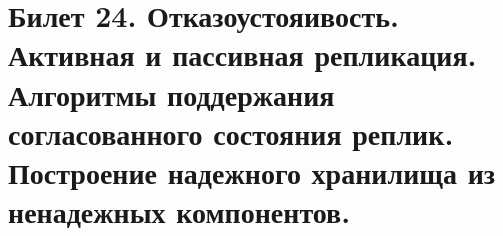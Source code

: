 \newpage
\section{Билет 24. Отказоустояивость. Активная и пассивная репликация. Алгоритмы поддержания согласованного состояния реплик. Построение надежного хранилища из ненадежных компонентов.}